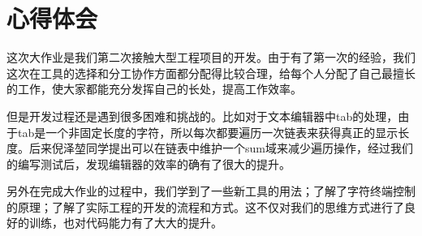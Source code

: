 \documentclass[a4paper,9pt]{article}
\begin{document}
\newpage
\section{心得体会}
这次大作业是我们第二次接触大型工程项目的开发。由于有了第一次的经验，我们这次在工具的选择和分工协作方面都分配得比较合理，给每个人分配了自己最擅长的工作，使大家都能充分发挥自己的长处，提高工作效率。

但是开发过程还是遇到很多困难和挑战的。比如对于文本编辑器中tab的处理，由于tab是一个非固定长度的字符，所以每次都要遍历一次链表来获得真正的显示长度。后来倪泽堃同学提出可以在链表中维护一个sum域来减少遍历操作，经过我们的编写测试后，发现编辑器的效率的确有了很大的提升。

另外在完成大作业的过程中，我们学到了一些新工具的用法；了解了字符终端控制的原理；了解了实际工程的开发的流程和方式。这不仅对我们的思维方式进行了良好的训练，也对代码能力有了大大的提升。
\end{document}
